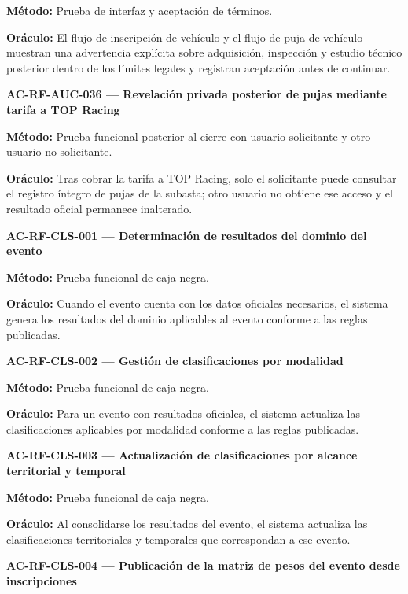\documentclass[10pt,letterpaper]{article}
\begin{document}
\textbf{Método:} Prueba de interfaz y aceptación de términos.\par
\textbf{Oráculo:} El flujo de inscripción de vehículo y el flujo de puja de vehículo muestran una advertencia explícita sobre adquisición, inspección y estudio técnico posterior dentro de los límites legales y registran aceptación antes de continuar.\par\vspace{0.45em}
\noindent\textbf{AC-RF-AUC-036 --- Revelación privada posterior de pujas mediante tarifa a TOP Racing}\par
\textbf{Método:} Prueba funcional posterior al cierre con usuario solicitante y otro usuario no solicitante.\par
\textbf{Oráculo:} Tras cobrar la tarifa a TOP Racing, solo el solicitante puede consultar el registro íntegro de pujas de la subasta; otro usuario no obtiene ese acceso y el resultado oficial permanece inalterado.\par\vspace{0.45em}
\noindent\textbf{AC-RF-CLS-001 --- Determinación de resultados del dominio del evento}\par
\textbf{Método:} Prueba funcional de caja negra.\par
\textbf{Oráculo:} Cuando el evento cuenta con los datos oficiales necesarios, el sistema genera los resultados del dominio aplicables al evento conforme a las reglas publicadas.\par\vspace{0.45em}
\noindent\textbf{AC-RF-CLS-002 --- Gestión de clasificaciones por modalidad}\par
\textbf{Método:} Prueba funcional de caja negra.\par
\textbf{Oráculo:} Para un evento con resultados oficiales, el sistema actualiza las clasificaciones aplicables por modalidad conforme a las reglas publicadas.\par\vspace{0.45em}
\noindent\textbf{AC-RF-CLS-003 --- Actualización de clasificaciones por alcance territorial y temporal}\par
\textbf{Método:} Prueba funcional de caja negra.\par
\textbf{Oráculo:} Al consolidarse los resultados del evento, el sistema actualiza las clasificaciones territoriales y temporales que correspondan a ese evento.\par\vspace{0.45em}
\noindent\textbf{AC-RF-CLS-004 --- Publicación de la matriz de pesos del evento desde inscripciones}\par
\end{document}
